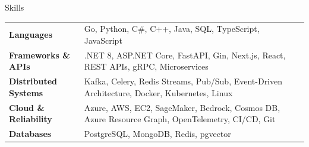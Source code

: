 \begin{rSection}{Skills}
    \begin{tabular}{@{} >{\bfseries}l @{\hspace{3ex}} p{} @{}}
        Languages & Go, Python, C\#, C++, Java, SQL, TypeScript, JavaScript \\
        Frameworks \& APIs & .NET 8, ASP.NET Core, FastAPI, Gin, Next.js, React, REST APIs, gRPC, Microservices \\
        Distributed Systems & Kafka, Celery, Redis Streams, Pub/Sub, Event-Driven Architecture, Docker, Kubernetes, Linux \\
        Cloud \& Reliability & Azure, AWS, EC2, SageMaker, Bedrock, Cosmos DB, Azure Resource Graph, OpenTelemetry, CI/CD, Git \\
        Databases & PostgreSQL, MongoDB, Redis, pgvector
    \end{tabular}
\end{rSection}
